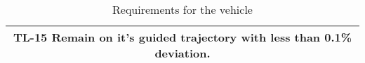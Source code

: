\begin{table}
\begin{tabular}{|c|}
	\\
	\cellcolor{blue!15} TL-15 Remain on it's guided trajectory with less than 0.1\% deviation.
	
	\\
	\hline
\end{tabular}
\caption{Requirements for the vehicle}
\end{table}
